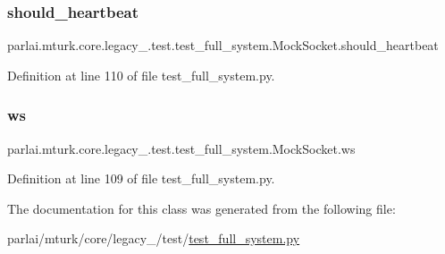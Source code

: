 \subsubsection{\texorpdfstring{should\+\_\+heartbeat}{should\_heartbeat}}
{\footnotesize\ttfamily parlai.\+mturk.\+core.\+legacy\+\_.\+test.\+test\+\_\+full\+\_\+system.\+Mock\+Socket.\+should\+\_\+heartbeat}



Definition at line 110 of file test\+\_\+full\+\_\+system.\+py.

\mbox{\label{classparlai_1_1mturk_1_1core_1_1legacy__2018_1_1test_1_1test__full__system_1_1MockSocket_a4880b2d86e4a803c00b8a3b1b9b83eeb}} 
\subsubsection{\texorpdfstring{ws}{ws}}
{\footnotesize\ttfamily parlai.\+mturk.\+core.\+legacy\+\_.\+test.\+test\+\_\+full\+\_\+system.\+Mock\+Socket.\+ws}



Definition at line 109 of file test\+\_\+full\+\_\+system.\+py.



The documentation for this class was generated from the following file\+:\begin{DoxyCompactItemize}
\item 
parlai/mturk/core/legacy\+\_/test/\hyperlink{legacy__2018_2test_2test__full__system_8py}{test\+\_\+full\+\_\+system.\+py}\end{DoxyCompactItemize}
